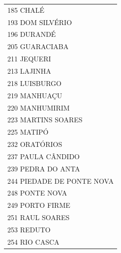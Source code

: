 \documentclass{article}
\begin{document}
\begin{longtable}[c]{m{18cm}}
\multicolumn{1}{l}{ \hspace{2em} 185 CHALÉ } \\
\multicolumn{1}{l}{ \hspace{2em} 193 DOM SILVÉRIO } \\
\multicolumn{1}{l}{ \hspace{2em} 196 DURANDÉ } \\
\multicolumn{1}{l}{ \hspace{2em} 205 GUARACIABA } \\
\multicolumn{1}{l}{ \hspace{2em} 211 JEQUERI } \\
\multicolumn{1}{l}{ \hspace{2em} 213 LAJINHA } \\
\multicolumn{1}{l}{ \hspace{2em} 218 LUISBURGO } \\
\multicolumn{1}{l}{ \hspace{2em} 219 MANHUAÇU } \\
\multicolumn{1}{l}{ \hspace{2em} 220 MANHUMIRIM } \\
\multicolumn{1}{l}{ \hspace{2em} 223 MARTINS SOARES } \\
\multicolumn{1}{l}{ \hspace{2em} 225 MATIPÓ } \\
\multicolumn{1}{l}{ \hspace{2em} 232 ORATÓRIOS } \\
\multicolumn{1}{l}{ \hspace{2em} 237 PAULA CÂNDIDO } \\
\multicolumn{1}{l}{ \hspace{2em} 239 PEDRA DO ANTA } \\
\multicolumn{1}{l}{ \hspace{2em} 244 PIEDADE DE PONTE NOVA } \\
\multicolumn{1}{l}{ \hspace{2em} 248 PONTE NOVA } \\
\multicolumn{1}{l}{ \hspace{2em} 249 PORTO FIRME } \\
\multicolumn{1}{l}{ \hspace{2em} 251 RAUL SOARES } \\
\multicolumn{1}{l}{ \hspace{2em} 253 REDUTO } \\
\multicolumn{1}{l}{ \hspace{2em} 254 RIO CASCA } \\

\end{longtable}
\end{document}
